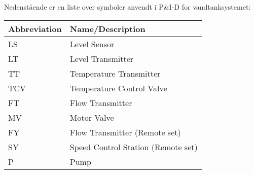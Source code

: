 \documentclass[12pt,a4paper]{article}
\begin{document}
	Nedenstående er en liste over symboler anvendt i P\&I-D for vandtanksystemet:
	\begin{table}[!h]
		\centering
		\begin{tabular}{ll}
			\textbf{Abbreviation} & \textbf{Name/Description} \\
			\hline
			LS & Level Sensor \\
			LT & Level Transmitter \\
			TT & Temperature Transmitter \\
			TCV & Temperature Control Valve \\
			FT & Flow Transmitter \\
			MV & Motor Valve \\
			FY & Flow Transmitter (Remote set) \\
			SY & Speed Control Station (Remote set) \\
			P & Pump \\
			
		\end{tabular}
	\end{table}
	\clearpage
\end{document}
